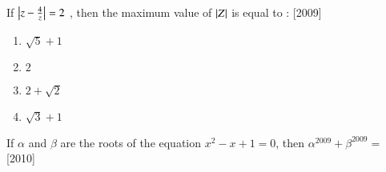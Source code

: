 \documentclass[journal,12pt,twocolumn]{IEEEtran}
\theoremstyle{remark}
\begin{document}
\begin{enumerate}
\begin{enumerate}
\end{enumerate}

\item If $\left\vert z - \frac{4}{z}\right\vert = 2$ , then the maximum value of $\left\vert Z\right\vert$ is equal to :
\hfill[2009]

\begin{enumerate}

	\item  $\sqrt{5} + 1$
	\item  $2$
	\item  $2 + \sqrt{2}$
	\item  $\sqrt{3} + 1$

\end{enumerate}

\item If $\alpha$ and $\beta$ are the roots of the equation $x^2 - x + 1 = 0$, then $\alpha^{2009} + \beta^{2009} =$
\hfill[2010]

\end{document}
